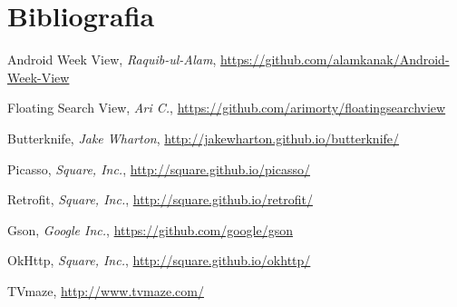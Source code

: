 \documentclass[10pt,a4paper]{article}
\begin{document}
\renewcommand*{\refname}{\vspace*{-2em}}
\section{Bibliografia}
\begin{thebibliography}{99}

Android Week View,
\emph{Raquib-ul-Alam},
\url{https://github.com/alamkanak/Android-Week-View}

Floating Search View,
\emph{Ari C.},
\url{https://github.com/arimorty/floatingsearchview}

Butterknife,
\emph{Jake Wharton},
\url{http://jakewharton.github.io/butterknife/}

Picasso,
\emph{Square, Inc.},
\url{http://square.github.io/picasso/}

Retrofit,
\emph{Square, Inc.},
\url{http://square.github.io/retrofit/}

Gson,
\emph{Google Inc.},
\url{https://github.com/google/gson}

OkHttp,
\emph{Square, Inc.},
\url{http://square.github.io/okhttp/}

TVmaze,
\url{http://www.tvmaze.com/}

\end{thebibliography}
\end{document}
